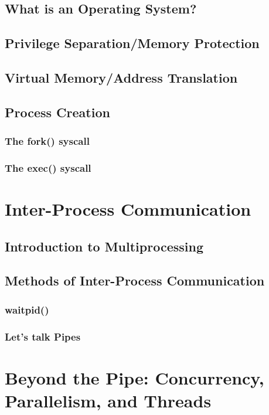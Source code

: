 \documentclass[a4paper, 12pt]{article}
\begin{document}
\subsection{What is an Operating System?}
\subsection{Privilege Separation/Memory Protection}
\subsection{Virtual Memory/Address Translation}
\subsection{Process Creation}
\subsubsection{The fork() syscall}
\subsubsection{The exec() syscall}

\newpage

\section{Inter-Process Communication}
\label{sec:ipcom}
\subsection{Introduction to Multiprocessing}
\subsection{Methods of Inter-Process Communication}
\subsubsection{waitpid()}
\subsubsection{Let's talk Pipes}

\newpage

\section{Beyond the Pipe: Concurrency, Parallelism, and Threads}
\label{sec:concstuff}
\end{document}
